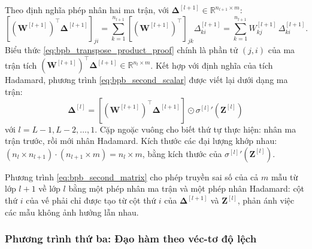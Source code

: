 Theo định nghĩa phép nhân hai ma trận, với $\boldsymbol{\Delta}^{[l+1]} \in \mathbb{R}^{n_{l+1} \times m}$:
\begin{equation}
\left[ \left(\mathbf{W}^{[l+1]}\right)^{\top}\boldsymbol{\Delta}^{[l+1]} \right]_{ji} = \sum_{k=1}^{n_{l+1}} \left[\left(\mathbf{W}^{[l+1]}\right)^{\top}\right]_{jk}\Delta_{ki}^{[l+1]} = \sum_{k=1}^{n_{l+1}} W_{kj}^{[l+1]}\,\Delta_{ki}^{[l+1]}.
\label{eq:bpb_transpose_product_proof}
\end{equation}
Biểu thức \eqref{eq:bpb_transpose_product_proof} chính là phần tử $(j,i)$ của ma trận tích $\left(\mathbf{W}^{[l+1]}\right)^{\top}\boldsymbol{\Delta}^{[l+1]} \in \mathbb{R}^{n_l \times m}$. Kết hợp với định nghĩa của tích Hadamard, phương trình \eqref{eq:bpb_second_scalar} được viết lại dưới dạng ma trận:
\begin{equation}
\boxed{
\boldsymbol{\Delta}^{[l]} = \left[ \left(\mathbf{W}^{[l+1]}\right)^{\top}\boldsymbol{\Delta}^{[l+1]} \right] \odot {\sigma^{[l]}}'\!\left(\mathbf{Z}^{[l]}\right)
}
\label{eq:bpb_second_matrix}
\end{equation}
với $l = L-1, L-2, \dots, 1$. Cặp ngoặc vuông cho biết thứ tự thực hiện: nhân ma trận trước, rồi mới nhân Hadamard. Kích thước các đại lượng khớp nhau: $(n_l \times n_{l+1})\cdot(n_{l+1} \times m) = n_l \times m$, bằng kích thước của ${\sigma^{[l]}}'\!\left(\mathbf{Z}^{[l]}\right)$.
 
Phương trình \eqref{eq:bpb_second_matrix} cho phép truyền sai số của cả $m$ mẫu từ lớp $l+1$ về lớp $l$ bằng một phép nhân ma trận và một phép nhân Hadamard: cột thứ $i$ của vế phải chỉ được tạo từ cột thứ $i$ của $\boldsymbol{\Delta}^{[l+1]}$ và $\mathbf{Z}^{[l]}$, phản ánh việc các mẫu không ảnh hưởng lẫn nhau.

\subsubsection{Phương trình thứ ba: Đạo hàm theo véc-tơ độ lệch}
 
